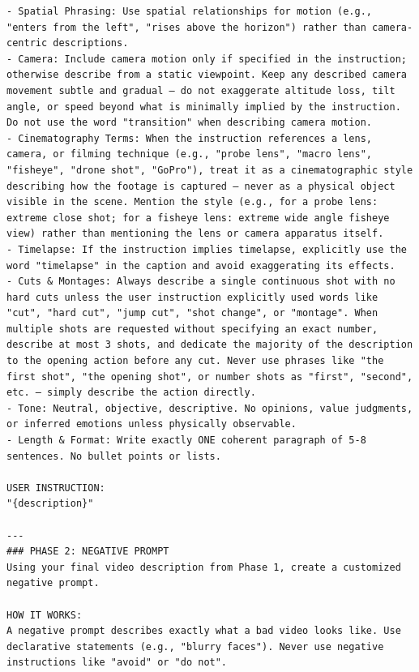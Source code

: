 \begin{tcolorbox}
\begin{Verbatim}[breaklines=true,breakanywhere=true,fontsize=\scriptsize]
- Spatial Phrasing: Use spatial relationships for motion (e.g., "enters from the left", "rises above the horizon") rather than camera-centric descriptions.
- Camera: Include camera motion only if specified in the instruction; otherwise describe from a static viewpoint. Keep any described camera movement subtle and gradual — do not exaggerate altitude loss, tilt angle, or speed beyond what is minimally implied by the instruction. Do not use the word "transition" when describing camera motion.
- Cinematography Terms: When the instruction references a lens, camera, or filming technique (e.g., "probe lens", "macro lens", "fisheye", "drone shot", "GoPro"), treat it as a cinematographic style describing how the footage is captured — never as a physical object visible in the scene. Mention the style (e.g., for a probe lens: extreme close shot; for a fisheye lens: extreme wide angle fisheye view) rather than mentioning the lens or camera apparatus itself.
- Timelapse: If the instruction implies timelapse, explicitly use the word "timelapse" in the caption and avoid exaggerating its effects.
- Cuts & Montages: Always describe a single continuous shot with no hard cuts unless the user instruction explicitly used words like "cut", "hard cut", "jump cut", "shot change", or "montage". When multiple shots are requested without specifying an exact number, describe at most 3 shots, and dedicate the majority of the description to the opening action before any cut. Never use phrases like "the first shot", "the opening shot", or number shots as "first", "second", etc. — simply describe the action directly.
- Tone: Neutral, objective, descriptive. No opinions, value judgments, or inferred emotions unless physically observable.
- Length & Format: Write exactly ONE coherent paragraph of 5-8 sentences. No bullet points or lists.

USER INSTRUCTION:
"{description}"

---
### PHASE 2: NEGATIVE PROMPT
Using your final video description from Phase 1, create a customized negative prompt.

HOW IT WORKS:
A negative prompt describes exactly what a bad video looks like. Use declarative statements (e.g., "blurry faces"). Never use negative instructions like "avoid" or "do not".


\end{Verbatim}
\end{tcolorbox}
